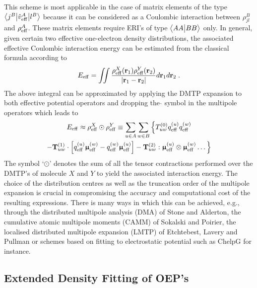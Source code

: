 \documentclass[aip,jcp,amsmath,amssymb,reprint,floatfix]{revtex4-1}
\begin{document}
This scheme is most applicable in the case of matrix elements of the type
$
 \bigl\langle {j^B} \bigl\lvert {\hat{v}_{\rm eff}^A} \bigl\lvert {l^B} \bigr\rangle
$
because it can be considered as a Coulombic interaction between $\rho^B_{jl}$
and $\rho^A_{\rm eff}$. These matrix elements require ERI's of type
$\bigl\langle {AA} \bigl\lvert {BB} \bigr\rangle$ only.
In general, given certain two effective one\hyp{}electron density distributions,
the associated effective Coulombic interaction energy can be estimated from the classical formula
according to
%
\begin{equation} \label{e:coulomb-energy:general}
  E_{\rm eff} = \iint \frac{\rho_{\rm eff}^X({\bf r}_1) \rho_{\rm eff}^Y({\bf r}_2)}
 {\vert {\bf r}_1 - {\bf r}_2 \vert} 
d{\bf r}_1 d{\bf r}_2 \;.
\end{equation}
%
The above integral can be approximated by 
applying the DMTP expansion 
to both effective potential operators
and dropping the $\hat{}$ symbol in the multipole operators
which leads to\cite{Stone.TheTheoryOfIntermolecularForces.1996}
%
\begin{multline} \label{e:coulomb-energy:dmtp}
  E_{\rm eff} \approx
 \rho_{\rm eff}^X \odot \rho_{\rm eff}^Y \equiv
 \sum_{u\in A} \sum_{w\in B} \Big\{ 
 T^{(0)}_{uw}
 q_{\rm eff}^{(u)}  q_{\rm eff}^{(w)} \\
 - {\bf T}^{(1)}_{uw} \cdot 
   \left[ q_{\rm eff}^{(u)} {\bm{\upmu}}_{\rm eff}^{(w)} - q_{\rm eff}^{(w)} {\bm{\upmu}}_{\rm eff}^{(u)} \right]
 - {\bf T}^{(2)}_{uw} : 
  {\bm{\upmu}}_{\rm eff}^{(u)}  \otimes {\bm{\upmu}}_{\rm eff}^{(w)} 
 \ldots
 \Big\}
\end{multline}
%
The symbol `$\odot$' denotes the sum of all the tensor contractions
performed over the DMTP's of molecule $X$ and $Y$ to yield the associated interaction energy.
The choice of the distribution centres as well as the truncation order of the multipole expansion
is crucial in compromising the accuracy and computational cost of the resulting expressions.
There is many ways in which this can be achieved, e.g., through the distributed multipole analysis (DMA)
of Stone and Alderton\cite{Stone.Alderton.MolPhys.1985,Stone.JCTC.2005},
the cumulative atomic multipole moments (CAMM) of Sokalski and Poirier\cite{Sokalski.Poirier.CPL.1983},
the localised distributed multipole expansion (LMTP) of Etchtebest, Lavery and Pullman\cite{Etchebest.Lavery.Pullman.TheorChimActa.1982}
or schemes based on fitting to electrostatic potential such as ChelpG\cite{Breneman.Wiberg.JCC.1990} for instance.

\subsection{\label{ss:2.3.oep-GDF}Extended Density Fitting of OEP's}
\end{document}
